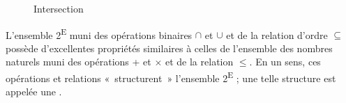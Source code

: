 {    \begin{figure}
    \caption{Intersection}                                                                   
    \end{figure}

    L’ensemble 2\textsuperscript{E} muni des opérations binaires \textrm{${\cap}$} et \textrm{${\cup}$} et de la relation d’ordre \textrm{${\subseteq}$} possède d’excellentes propriétés similaires à celles de l’ensemble des nombres naturels muni des opérations + et \textrm{${\times}$} et de la relation ${\leq}$. En un sens, ces opérations et relations «~structurent~» l’ensemble 2\textsuperscript{E} ; une telle structure est appelée une .
    }
